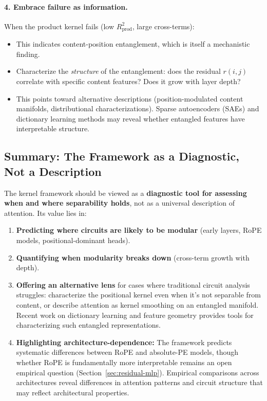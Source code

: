 \documentclass[11pt]{article}
\theoremstyle{definition}
\begin{document}
\paragraph{4. Embrace failure as information.}
When the product kernel fails (low $R^2_{\text{prod}}$, large cross-terms):
\begin{itemize}
    \item This indicates content-position entanglement, which is itself a mechanistic finding.
    \item Characterize the \emph{structure} of the entanglement: does the residual $r(i,j)$ correlate with specific content features? Does it grow with layer depth?
    \item This points toward alternative descriptions (position-modulated content manifolds, distributional characterizations). Sparse autoencoders (SAEs) \cite{bricken2023monosemanticity,templeton2024sae} and dictionary learning methods may reveal whether entangled features have interpretable structure.
\end{itemize}

\subsection{Summary: The Framework as a Diagnostic, Not a Description}

The kernel framework should be viewed as a \textbf{diagnostic tool for assessing when and where separability holds}, not as a universal description of attention. Its value lies in:
\begin{enumerate}
    \item \textbf{Predicting where circuits are likely to be modular} (early layers, RoPE models, positional-dominant heads).
    \item \textbf{Quantifying when modularity breaks down} (cross-term growth with depth).
    \item \textbf{Offering an alternative lens} for cases where traditional circuit analysis struggles: characterize the positional kernel even when it's not separable from content, or describe attention as kernel smoothing on an entangled manifold. Recent work on dictionary learning \cite{cunningham2024dictlearning} and feature geometry \cite{park2024geometry} provides tools for characterizing such entangled representations.
    \item \textbf{Highlighting architecture-dependence:} The framework predicts systematic differences between RoPE and absolute-PE models, though whether RoPE is fundamentally more interpretable remains an open empirical question (Section~\ref{sec:residual-mlp}). Empirical comparisons across architectures \cite{mukherjee2024gpt2llama,tigges2024circuits} reveal differences in attention patterns and circuit structure that may reflect architectural properties.
\end{enumerate}
\end{document}
